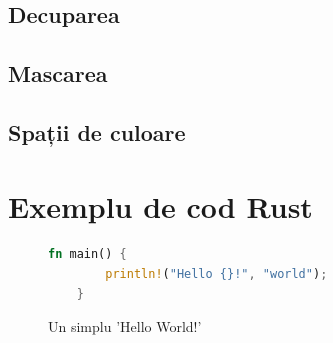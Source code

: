 \documentclass[a4paper, 12pt]{report}
\begin{document}
\section{Decuparea}

\section{Mascarea}

\section{Spații de culoare}

\chapter{Exemplu de cod Rust}

\begin{figure}[ht]
    \centering
    \begin{lstlisting}[language=Rust]
    fn main() {
        println!("Hello {}!", "world");
    }
    \end{lstlisting}
    \caption{Un simplu 'Hello World!'}
    \label{fig-rust}
\end{figure}

\printbibliography
\end{document}
